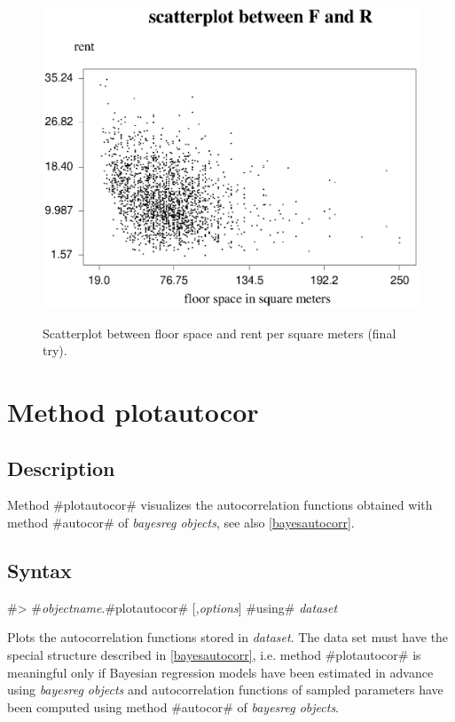 \begin{figure}[ht]
\begin{center}
\includegraphics[scale=0.7]{grafiken/plotrf4.ps}
{\em\caption{ \label{plotrf4} Scatterplot between floor space and
rent per square meters (final try).}}
\end{center}
\end{figure}
\clearpage

\section{Method plotautocor}
\label{graphplotautocor} 

\subsection*{Description}

Method #plotautocor# visualizes the autocorrelation functions
obtained with method #autocor# of {\em bayesreg objects}, see also
\autoref{bayesautocorr}.


\subsection*{Syntax}

#> #{\em objectname}.#plotautocor# [,{\em options}] #using# {\em dataset}

Plots the autocorrelation functions stored in {\em dataset}. The
data set must have the special structure described in
\autoref{bayesautocorr}, i.e. method #plotautocor# is meaningful
only if Bayesian regression models have been estimated in advance
using {\em bayesreg objects} and autocorrelation functions of
sampled parameters have been computed using method #autocor# of
{\em bayesreg objects}.

